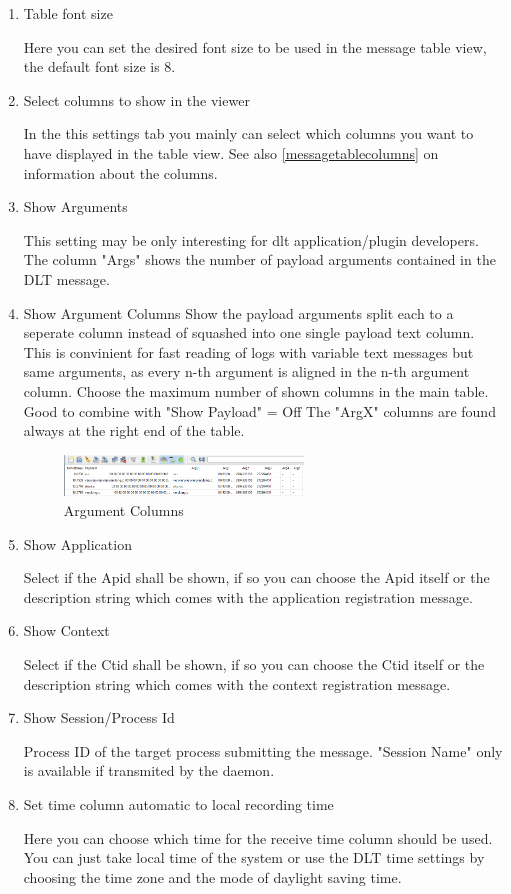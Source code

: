 \documentclass[a4paper,11pt]{article}
\begin{document}
\nopagebreak

\begin{enumerate}
\item{Table font size}

Here you can set the desired font size to be used in the message table view, the default font size is 8.

\item{Select columns to show in the viewer}

In the this settings tab you mainly can select which columns you want to have displayed in the table view.
See also \autoref{messagetablecolumns} on information about the columns.

\item{Show Arguments}

This setting may be only interesting for dlt application/plugin developers. The column "Args" shows the number of payload arguments contained in the DLT message.

\item{Show Argument Columns}
Show the payload arguments split each to a seperate column instead of squashed into one single payload text column.
This is convinient for fast reading of logs with variable text messages but same arguments, as every n-th argument is aligned in the n-th argument column.
Choose the maximum number of shown columns in the main table. 
Good to combine with "Show Payload" = Off
The "ArgX" columns are found always at the right end of the table. 
\begin{figure}[H]
 \centering
 \includegraphics[width=0.6\textwidth]{images/tableview_arguments.png}
 \caption{Argument Columns }
 \label{fig:agrumentcolumns}
\end{figure}

\item{Show Application}

Select if the Apid shall be shown, if so you can choose the Apid itself or the description string which comes with the application registration message.

\item{Show Context}

Select if the Ctid shall be shown, if so you can choose the Ctid itself or the description string which comes with the context registration message.

\item{Show Session/Process Id}

Process ID of the target process submitting the message. "Session Name" only is available if transmited by the daemon.

\item{Set time column automatic to local recording time}

Here you can choose which time for the receive time column should be used. You can just take local time of the system
or use the DLT time settings by choosing the time zone and the mode of daylight saving time.
\end{enumerate}
\end{document}

